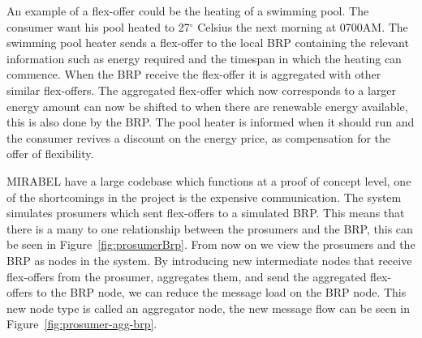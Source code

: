 \documentclass{ifacconf}
\begin{document}
An example of a flex-offer could be the heating of a swimming pool. 
The consumer want his pool heated to 27$^\circ$ Celsius the next morning at 0700AM.
The swimming pool heater sends a flex-offer to the local BRP containing the relevant information such as energy required and the timespan in which the heating can commence.
When the BRP receive the flex-offer it is aggregated with other similar flex-offers. 
The aggregated flex-offer which now corresponds to a larger energy amount can now be shifted to when there are renewable energy available, this is also done by the BRP.  
The pool heater is informed when it should run and the consumer revives a discount on the energy price, as compensation for the offer of flexibility. 


MIRABEL have a large codebase which functions at a proof of concept level, one of the shortcomings in the project is the expensive communication.
The system simulates prosumers which sent flex-offers to a simulated BRP. 
This means that there is a many to one relationship between the prosumers and the BRP, this can be seen in Figure~\ref{fig:prosumerBrp}.
From now on we view the prosumers and the BRP as nodes in the system.
By introducing new intermediate nodes that receive flex-offers from the prosumer, aggregates them, and send the aggregated flex-offers to the BRP node, we can reduce the message load on the BRP node. 
This new node type is called an aggregator node, the new message flow can be seen in Figure~\ref{fig:prosumer-agg-brp}.
\end{document}
